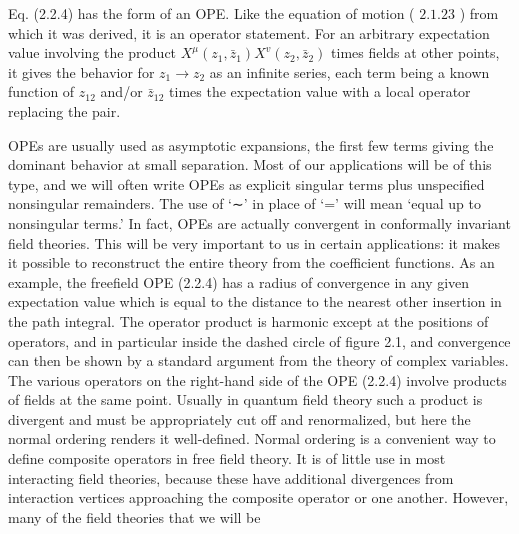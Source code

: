 Eq. (2.2.4) has the form of an OPE. Like the equation of motion ( $2.1 .23$ ) from which it was derived, it is an operator statement. For an arbitrary expectation value involving the product $X^{\mu}\left(z_{1}, \bar{z}_{1}\right) X^{v}\left(z_{2}, \bar{z}_{2}\right)$ times fields at other points, it gives the behavior for $z_{1} \rightarrow z_{2}$ as an infinite series, each term being a known function of $z_{12}$ and/or $\bar{z}_{12}$ times the expectation value with a local operator replacing the pair.

OPEs are usually used as asymptotic expansions, the first few terms
giving the dominant behavior at small separation. Most of our applications will be of this type, and we will often write OPEs as explicit singular
terms plus unspecified nonsingular remainders. The use of ‘∼’ in place of
‘=’ will mean ‘equal up to nonsingular terms.’ In fact, OPEs are actually
convergent in conformally invariant field theories. This will be very important to us in certain applications: it makes it possible to reconstruct
the entire theory from the coefficient functions. As an example, the freefield OPE (2.2.4) has a radius of convergence in any given expectation
value which is equal to the distance to the nearest other insertion in the
path integral. The operator product is harmonic except at the positions
of operators, and in particular inside the dashed circle of figure 2.1, and
convergence can then be shown by a standard argument from the theory
of complex variables.
The various operators on the right-hand side of the OPE (2.2.4) involve
products of fields at the same point. Usually in quantum field theory such
a product is divergent and must be appropriately cut off and renormalized,
but here the normal ordering renders it well-defined. Normal ordering is a
convenient way to define composite operators in free field theory. It is of
little use in most interacting field theories, because these have additional
divergences from interaction vertices approaching the composite operator
or one another. However, many of the field theories that we will be

